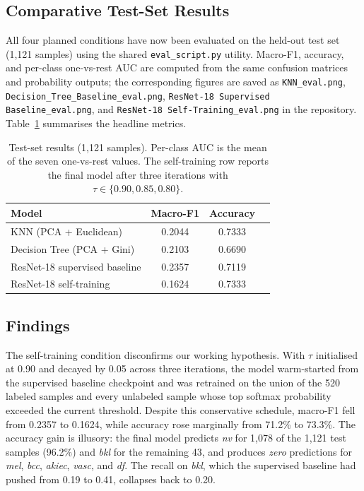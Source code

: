 \documentclass[conference]{IEEEtran}
\begin{document}
\subsection{Comparative Test-Set Results}
All four planned conditions have now been evaluated on the held-out
test set (1{,}121 samples) using the shared \texttt{eval\_script.py}
utility. Macro-F1, accuracy, and per-class one-vs-rest AUC are
computed from the same confusion matrices and probability outputs;
the corresponding figures are saved as
\texttt{KNN\_eval.png},
\texttt{Decision\_Tree\_Baseline\_eval.png},
\texttt{ResNet-18 Supervised Baseline\_eval.png}, and
\texttt{ResNet-18 Self-Training\_eval.png} in the repository.
Table~\ref{tab:results} summarises the headline metrics.

\begin{table}[h]
\centering
\caption{Test-set results (1{,}121 samples). Per-class AUC is the
mean of the seven one-vs-rest values. The self-training row reports
the final model after three iterations with $\tau \in \{0.90, 0.85,
0.80\}$.}
\label{tab:results}
\begin{tabular}{lccc}
\hline
\textbf{Model} & \textbf{Macro-F1} & \textbf{Accuracy} \\
\hline
KNN (PCA + Euclidean)         & 0.2044 & 0.7333 \\
Decision Tree (PCA + Gini)    & 0.2103 & 0.6690 \\
ResNet-18 supervised baseline & 0.2357 & 0.7119 \\
ResNet-18 self-training       & 0.1624 & 0.7333 \\
\hline
\end{tabular}
\end{table}

\subsection{Findings}
The self-training condition disconfirms our working hypothesis. With
$\tau$ initialised at 0.90 and decayed by 0.05 across three
iterations, the model warm-started from the supervised baseline
checkpoint and was retrained on the union of the 520 labeled samples
and every unlabeled sample whose top softmax probability exceeded the
current threshold. Despite this conservative schedule, macro-F1 fell
from 0.2357 to 0.1624, while accuracy rose marginally from 71.2\% to
73.3\%. The accuracy gain is illusory: the final model predicts
\emph{nv} for 1{,}078 of the 1{,}121 test samples (96.2\%) and
\emph{bkl} for the remaining 43, and produces \emph{zero} predictions
for \emph{mel}, \emph{bcc}, \emph{akiec}, \emph{vasc}, and \emph{df}.
The recall on \emph{bkl}, which the supervised baseline had pushed
from 0.19 to 0.41, collapses back to 0.20.
\end{document}
